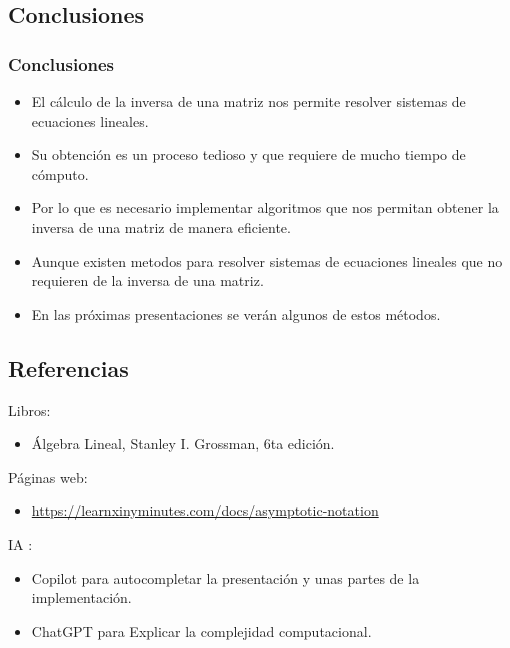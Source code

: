 \documentclass{beamer}
\begin{document}
    \subsection{Conclusiones}
    \begin{frame}
        \frametitle{Conclusiones}
        \begin{itemize}
            \item El cálculo de la inversa de una matriz nos permite resolver sistemas de ecuaciones lineales.\\
            \item Su obtención es un proceso tedioso y que requiere de mucho tiempo de cómputo.\\
            \item Por lo que es necesario implementar algoritmos que nos permitan obtener la inversa de una matriz de manera eficiente.\\
            \item Aunque existen metodos para resolver sistemas de ecuaciones lineales que no requieren de la inversa de una matriz.\\
            \item En las próximas presentaciones se verán algunos de estos métodos.
        \end{itemize}
    \end{frame}
    \subsection{Referencias}
    \begin{frame}
        Libros:
        \begin{itemize}
            \item Álgebra Lineal, Stanley I. Grossman, 6ta edición.
        \end{itemize}
        Páginas web:
        \begin{itemize}
            \item\url{https://learnxinyminutes.com/docs/asymptotic-notation}
        \end{itemize}
        IA :
        \begin{itemize}
            \item Copilot para autocompletar la presentación y unas partes de la implementación.
            \item ChatGPT para Explicar la complejidad computacional.
        \end{itemize}
    \end{frame}
\end{document}
